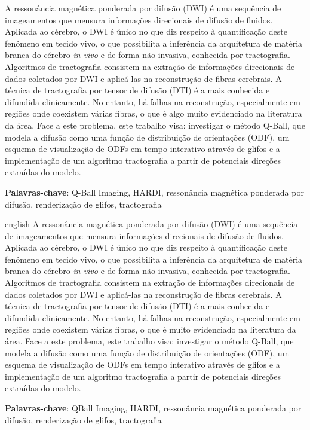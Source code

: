 \documentclass[
    12pt,                %
    oneside,            %
    a4paper,            %
    english,            %
    french,                %
    spanish,            %
    brazil                %
    ]{abntex2}
\begin{document}
\setlength{\absparsep}{18pt} %
\begin{resumo}

A ressonância magnética ponderada por difusão (DWI) é uma sequência de imageamentos que mensura informações direcionais de difusão de fluidos. Aplicada ao cérebro, o DWI é único no que diz respeito à quantificação deste fenômeno em tecido vivo, o que possibilita a inferência da arquitetura de matéria branca do cérebro \textit{in-vivo} e de forma não-invasiva, conhecida por tractografia. Algoritmos de tractografia consistem na extração de informações direcionais de dados coletados por DWI e aplicá-las na reconstrução de fibras cerebrais. A técnica de tractografia por tensor de difusão (DTI) é a mais conhecida e difundida clinicamente. No entanto, há falhas na reconstrução, especialmente em regiões onde coexistem várias fibras, o que é algo muito evidenciado na literatura da área. Face a este problema, este trabalho visa: investigar o método Q-Ball, que modela a difusão como uma função de distribuição de orientações (ODF), um esquema de visualização de ODFs em tempo interativo através de glifos e a implementação de um algoritmo tractografia a partir de potenciais direções extraídas do modelo.

\vspace{\onelineskip}
\noindent\textbf{Palavras-chave}: Q-Ball Imaging, HARDI, ressonância magnética ponderada por difusão, renderização de glifos, tractografia
\end{resumo}
\pagebreak
%
\begin{resumo}[Abstract]
 \begin{otherlanguage*}{english}
A ressonância magnética ponderada por difusão (DWI) é uma sequência de imageamentos que mensura informações direcionais de difusão de fluidos. Aplicada ao cérebro, o DWI é único no que diz respeito à quantificação deste fenômeno em tecido vivo, o que possibilita a inferência da arquitetura de matéria branca do cérebro \textit{in-vivo} e de forma não-invasiva, conhecida por tractografia. Algoritmos de tractografia consistem na extração de informações direcionais de dados coletados por DWI e aplicá-las na reconstrução de fibras cerebrais. A técnica de tractografia por tensor de difusão (DTI) é a mais conhecida e difundida clinicamente. No entanto, há falhas na reconstrução, especialmente em regiões onde coexistem várias fibras, o que é muito evidenciado na literatura da área. Face a este problema, este trabalho visa: investigar o método Q-Ball, que modela a difusão como uma função de distribuição de orientações (ODF), um esquema de visualização de ODFs em tempo interativo através de glifos e a implementação de um algoritmo tractografia a partir de potenciais direções extraídas do modelo.

\vspace{\onelineskip}
\noindent\textbf{Palavras-chave}: QBall Imaging, HARDI, ressonância magnética ponderada por difusão, renderização de glifos, tractografia
 \end{otherlanguage*}
\end{resumo}
\end{document}
